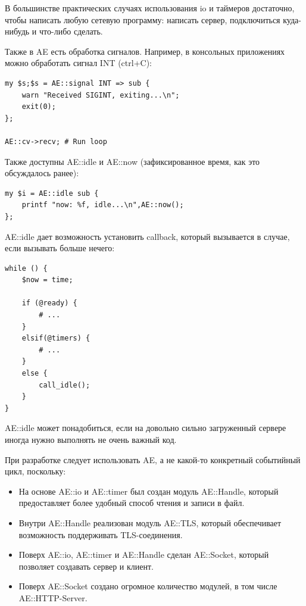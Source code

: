 В большинстве практических случаях использования io и таймеров достаточно, чтобы написать любую сетевую программу: написать сервер, подключиться куда-нибудь и что-либо сделать.

Также в AE есть обработка сигналов. Например, в консольных приложениях можно обработать сигнал INT (ctrl+C):
\begin{verbatim}
my $s;$s = AE::signal INT => sub {
    warn "Received SIGINT, exiting...\n";
    exit(0);
};

AE::cv->recv; # Run loop
\end{verbatim}
Также доступны AE::idle и AE::now (зафиксированное время, как это обсуждалось ранее):
\begin{verbatim}
my $i = AE::idle sub {
    printf "now: %f, idle...\n",AE::now();
};
\end{verbatim}
AE::idle дает возможность установить callback, который вызывается в случае, если вызывать больше нечего:
\begin{verbatim}
while () {
    $now = time;

    if (@ready) {
        # ...
    }
    elsif(@timers) {
        # ...
    }
    else {
        call_idle();
    }
}
\end{verbatim}
AE::idle может понадобиться, если на довольно сильно загруженный сервере иногда нужно выполнять не очень важный код.


При разработке следует использовать AE, а не какой-то конкретный событийный цикл, поскольку:
\begin{itemize}
	\item На основе AE::io и AE::timer был создан модуль AE::Handle, который предоставляет более удобный способ чтения и записи в файл.
	\item Внутри AE::Handle реализован модуль AE::TLS, который обеспечивает возможность поддерживать TLS-соединения.
	\item Поверх AE::io, AE::timer и AE::Handle сделан AE::Socket, который позволяет создавать сервер и клиент.
	\item Поверх AE::Socket создано огромное количество модулей, в том числе AE::HTTP-Server.
\end{itemize}


